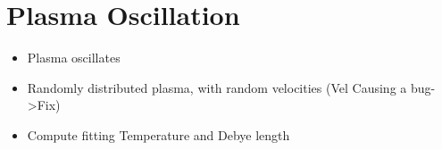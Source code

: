 \section{Plasma Oscillation}
    \begin{itemize}
        \item Plasma oscillates
        \item Randomly distributed plasma, with random velocities (Vel Causing a bug->Fix)
        \item Compute fitting Temperature and Debye length
    \end{itemize}
